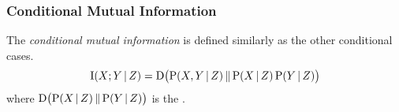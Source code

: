 \subsubsection{Conditional Mutual Information}\label{subsubsec:Conditional_Mutual_Information}
\begin{definition}\label{def:Conditional_Mutual_Information}
  The \emph{conditional mutual information} is defined similarly as the other conditional cases.
  \begin{equation}\label{eq:Conditional_Mutual_Information}
    \operatorname{\operatorname{I}}(X; Y \operatorname{\vert} Z) = \operatorname{\operatorname{D}} \bigl( \operatorname{\operatorname{P}}(X,Y \operatorname{\vert} Z) \operatorname{\Vert} \operatorname{\operatorname{P}}(X \operatorname{\vert} Z) \operatorname{\operatorname{P}}(Y \operatorname{\vert} Z) \bigr)
  \end{equation}
  where $\operatorname{\operatorname{D}} \bigl( \operatorname{\operatorname{P}}(X \operatorname{\vert} Z) \operatorname{\Vert} \operatorname{\operatorname{P}}(Y \operatorname{\vert} Z) \bigr)$ is the .
\end{definition}

